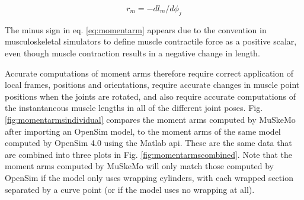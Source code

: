 \documentclass{article}
\begin{document}
\begin{equation}
r_m = -dl_m / d\phi_j
\end{equation}
\label{eq:momentarm}

The minus sign in eq. \ref{eq:momentarm} appears due to the convention in musculoskeletal simulators to define muscle contractile force as a positive scalar, even though muscle contraction results in a negative change in length.

Accurate computations of moment arms therefore require correct application of local frames, positions and orientations, require accurate changes in muscle point positions when the joints are rotated, and also require accurate computations of the instantaneous muscle lengths in all of the different joint poses. Fig. \ref{fig:momentarmsindividual} compares the moment arms computed by MuSkeMo after importing an OpenSim model, to the moment arms of the same model computed by OpenSim 4.0 using the Matlab api. These are the same data that are combined into three plots in Fig. \ref{fig:momentarmscombined}. Note that the moment arms computed by MuSkeMo will only match those computed by OpenSim if the model only uses wrapping cylinders, with each wrapped section separated by a curve point (or if the model uses no wrapping at all).
\end{document}

